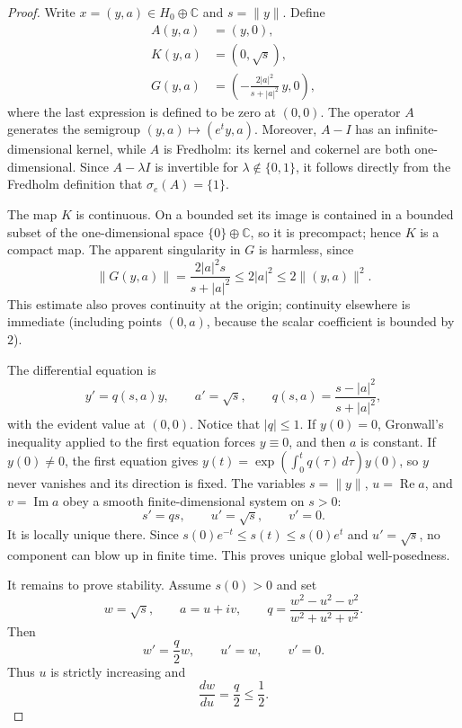 \documentclass[11pt]{article}
\newcommand{\C}{\mathbb C}
\begin{document}
\begin{proof}
Write $x=(y,a)\in H_0\oplus\C$ and $s=\|y\|$.  Define
\begin{align*}
 A(y,a)&=(y,0),\\
 K(y,a)&=(0,\sqrt{s}),\\
 G(y,a)&=\left(-\frac{2|a|^2}{s+|a|^2}\,y,0\right),
\end{align*}
where the last expression is defined to be zero at $(0,0)$.  The operator
$A$ generates the semigroup $(y,a)\mapsto(e^t y,a)$.  Moreover, $A-I$ has an
infinite-dimensional kernel, while $A$ is Fredholm: its kernel and cokernel
are both one-dimensional.  Since $A-\lambda I$ is invertible for
$\lambda\notin\{0,1\}$, it follows directly from the Fredholm definition that
$\sigma_e(A)=\{1\}$.

The map $K$ is continuous.  On a bounded set its image is contained in a
bounded subset of the one-dimensional space $\{0\}\oplus\C$, so it is
precompact; hence $K$ is a compact map.  The apparent singularity in $G$ is
harmless, since
\begin{equation}\label{eq:Gbound}
 \|G(y,a)\|=\frac{2|a|^2s}{s+|a|^2}
 \le2|a|^2\le2\|(y,a)\|^2.
\end{equation}
This estimate also proves continuity at the origin; continuity elsewhere is
immediate (including points $(0,a)$, because the scalar coefficient is
bounded by $2$).

The differential equation is
\begin{equation}\label{eq:system}
 y'=q(s,a)y,\qquad a'=\sqrt{s},\qquad
 q(s,a)=\frac{s-|a|^2}{s+|a|^2},
\end{equation}
with the evident value at $(0,0)$.  Notice that $|q|\le1$.  If $y(0)=0$,
Gronwall's inequality applied to the first equation forces $y\equiv0$, and
then $a$ is constant.  If $y(0)\ne0$, the first equation gives
$y(t)=\exp(\int_0^t q(\tau)\,d\tau)y(0)$, so $y$ never vanishes and its
direction is fixed.  The variables $s=\|y\|$, $u=\operatorname{Re}a$, and
$v=\operatorname{Im}a$ obey a smooth finite-dimensional system on $s>0$:
\[
 s'=qs,\qquad u'=\sqrt{s},\qquad v'=0.
\]
It is locally unique there.  Since $s(0)e^{-t}\le s(t)\le s(0)e^t$ and
$u'=\sqrt{s}$, no component can blow up in finite time.  This proves unique
global well-posedness.

It remains to prove stability.  Assume $s(0)>0$ and set
\[
 w=\sqrt{s},\qquad a=u+iv,\qquad
 q=\frac{w^2-u^2-v^2}{w^2+u^2+v^2}.
\]
Then
\begin{equation}\label{eq:phase}
 w'=\frac q2w,\qquad u'=w,
 \qquad v'=0.
\end{equation}
Thus $u$ is strictly increasing and
\begin{equation}\label{eq:dwdU}
 \frac{dw}{du}=\frac q2\le\frac12.
\end{equation}


\end{proof}
\end{document}
